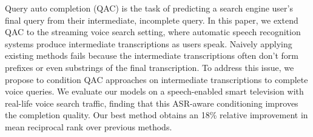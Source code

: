 Query auto completion (QAC) is the task of predicting a search engine user's final query from their intermediate, incomplete query. In this paper, we extend QAC to the streaming voice search setting, where automatic speech recognition systems produce intermediate transcriptions as users speak. Naively applying existing methods fails because the intermediate transcriptions often don't form prefixes or even substrings of the final transcription. To address this issue, we propose to condition QAC approaches on intermediate transcriptions to complete voice queries. We evaluate our models on a speech-enabled smart television with real-life voice search traffic, finding that this ASR-aware conditioning improves the completion quality. Our best method obtains an 18\% relative improvement in mean reciprocal rank over previous methods.
